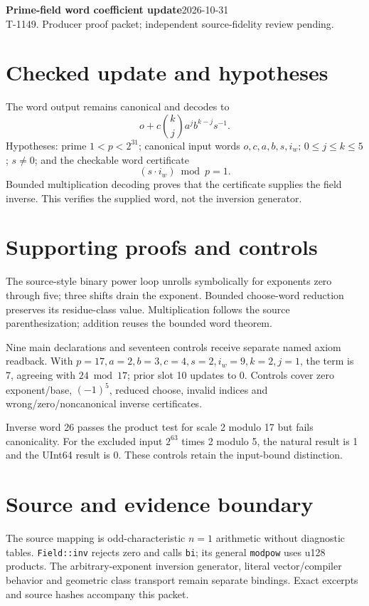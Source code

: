 \documentclass[10pt]{article}
\begin{document}
\textbf{Prime-field word coefficient update}\hfill2026-10-31\\T-1149. Producer proof packet; independent source-fidelity review pending.
\section*{Checked update and hypotheses}
The word output remains canonical and decodes to
\[o+c\binom{k}{j}a^jb^{k-j}s^{-1}.\]
Hypotheses: prime $1<p<2^{31}$; canonical input words $o,c,a,b,s,i_w$; $0\le j\le k\le5$; $s\ne0$; and the checkable word certificate
\[ (s\cdot i_w)\bmod p=1.\]
Bounded multiplication decoding proves that the certificate supplies the field inverse. This verifies the supplied word, not the inversion generator.
\begin{center}\end{center}
\section*{Supporting proofs and controls}
The source-style binary power loop unrolls symbolically for exponents zero through five; three shifts drain the exponent. Bounded choose-word reduction preserves its residue-class value. Multiplication follows the source parenthesization; addition reuses the bounded word theorem.

Nine main declarations and seventeen controls receive separate named axiom readback. With $p=17,a=2,b=3,c=4,s=2,i_w=9,k=2,j=1$, the term is 7, agreeing with $24\bmod17$; prior slot 10 updates to 0. Controls cover zero exponent/base, $(-1)^5$, reduced choose, invalid indices and wrong/zero/noncanonical inverse certificates.

Inverse word 26 passes the product test for scale 2 modulo 17 but fails canonicality. For the excluded input $2^{63}$ times 2 modulo 5, the natural result is 1 and the UInt64 result is 0. These controls retain the input-bound distinction.
\section*{Source and evidence boundary}
The source mapping is odd-characteristic $n=1$ arithmetic without diagnostic tables. \texttt{Field::inv} rejects zero and calls \texttt{bi}; its general \texttt{modpow} uses u128 products. The arbitrary-exponent inversion generator, literal vector/compiler behavior and geometric class transport remain separate bindings. Exact excerpts and source hashes accompany this packet.
\end{document}
